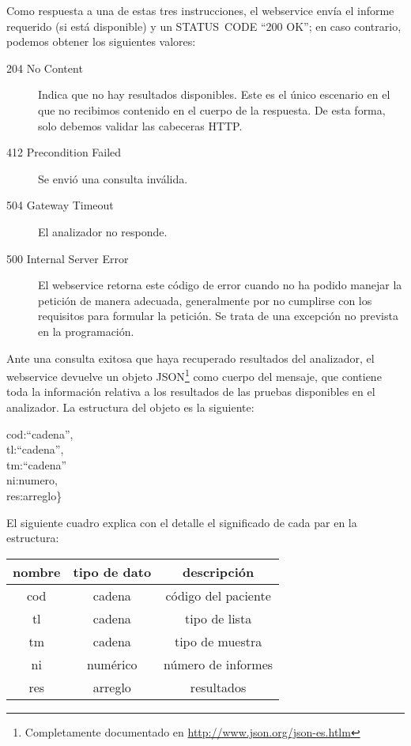 \documentclass[titlepage,12pt]{article}
\begin{document}
Como respuesta a una de estas tres instrucciones, el webservice envía
el informe requerido (si está disponible) y un \textsf{STATUS~CODE}
``\textsf{200 OK}''; en caso contrario, podemos obtener los siguientes
valores:

\begin{description}
  \item[\textsf{204 No Content}] Indica que no hay resultados
    disponibles. Este es el único escenario en el que no recibimos
    contenido en el cuerpo de la respuesta. De esta forma, solo
    debemos validar las cabeceras HTTP.
  \item[\textsf{412 Precondition Failed}] Se envió una consulta inválida.
  \item[\textsf{504 Gateway Timeout}] El analizador no responde.
  \item[\textsf{500 Internal Server Error}] El webservice retorna este
    código de error cuando no ha podido manejar la petición de manera
    adecuada, generalmente por no cumplirse con los requisitos para
    formular la petición. Se trata de una excepción no prevista en la
    programación.
\end{description}

Ante una consulta exitosa que haya recuperado resultados del
analizador, el webservice devuelve un objeto
\textsf{JSON}\footnote{Completamente documentado en
  \url{http://www.json.org/json-es.htlm}} como cuerpo del mensaje, que
contiene toda la información relativa a los resultados de las pruebas
disponibles en el analizador. La estructura del objeto es la siguiente:

\begin{minipage}{5cm}
\ttfamily 
\textbraceleft cod:``cadena'',\\
tl:``cadena'',\\
tm:``cadena''\\
ni:numero,\\
res:arreglo\}
\end{minipage}

El siguiente cuadro explica con el detalle el significado de cada par
en la estructura:
\begin{center}
\begin{tabular}{|c|c|c|} \hline
\textbf{nombre} & \textbf{tipo de dato} & \textbf{descripción}\\ \hline
cod & cadena & código del paciente \\ \hline
tl  & cadena & tipo de lista \\ \hline
tm  & cadena & tipo de muestra \\ \hline
ni  & numérico & número de informes \\ \hline
res & arreglo & resultados \\ \hline
\end{tabular}
\end{center}
\end{document}
